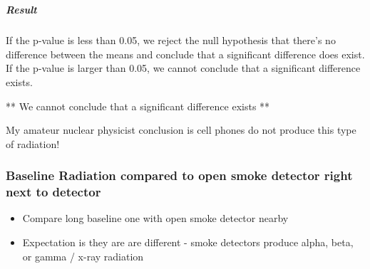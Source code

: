 \documentclass[11pt]{article}
\providecommand{\tightlist}{%
      \setlength{\itemsep}{0pt}\setlength{\parskip}{0pt}}
\begin{document}
    \begin{center}
    \end{center}
    { \hspace*{\fill} \\}
    
    \subparagraph{Result}\label{result}

If the p-value is less than 0.05, we reject the null hypothesis that
there's no difference between the means and conclude that a significant
difference does exist. If the p-value is larger than 0.05, we cannot
conclude that a significant difference exists.

** We cannot conclude that a significant difference exists **

My amateur nuclear physicist conclusion is cell phones do not produce
this type of radiation!

    \subsubsection{Baseline Radiation compared to open smoke detector right
next to
detector}\label{baseline-radiation-compared-to-open-smoke-detector-right-next-to-detector}

\begin{itemize}
\tightlist
\item
  Compare long baseline one with open smoke detector nearby
\item
  Expectation is they are are different - smoke detectors produce alpha,
  beta, or gamma / x-ray radiation
\end{itemize}
\end{document}
